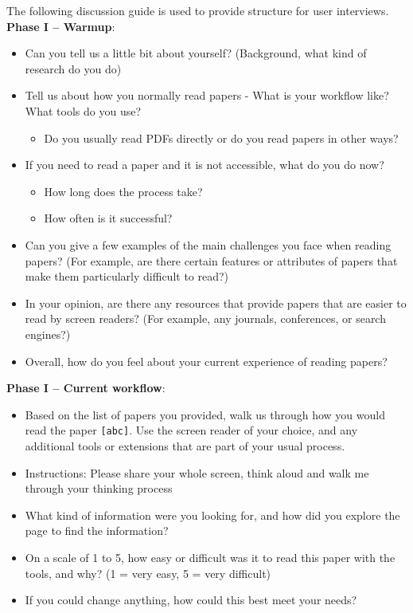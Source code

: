 The following discussion guide is used to provide structure for user interviews. \\

\textbf{Phase I -- Warmup}:
\begin{itemize}
    \item Can you tell us a little bit about yourself? (Background, what kind of research do you do)
    \item Tell us about how you normally read papers - What is your workflow like? What tools do you use? 
    \begin{itemize}
        \item Do you usually read PDFs directly or do you read papers in other ways?
    \end{itemize}
    \item If you need to read a paper and it is not accessible, what do you do now?
    \begin{itemize}
        \item How long does the process take?
        \item How often is it successful?
    \end{itemize}
    \item Can you give a few examples of the main challenges you face when reading papers?  (For example, are there certain features or attributes of papers that make them particularly difficult to read?) 
    \item In your opinion, are there any resources that provide papers that are easier to read by screen readers? (For example, any journals, conferences, or search engines?)
    \item Overall, how do you feel about your current experience of reading papers? 
\end{itemize}

\textbf{Phase I -- Current workflow}:
\begin{itemize}
    \item Based on the list of papers you provided, walk us through how you would read the paper \texttt{[abc]}. Use the screen reader of your choice, and any additional tools or extensions that are part of your usual process.
    \item Instructions: Please share your whole screen, think aloud and walk me through your thinking process
    \item What kind of information were you looking for, and how did you explore the page to find the information?
    \item On a scale of 1 to 5, how easy or difficult was it to read this paper with the tools, and why? (1 = very easy, 5 = very difficult)
    \item If you could change anything, how could this best meet your needs?
\end{itemize}

